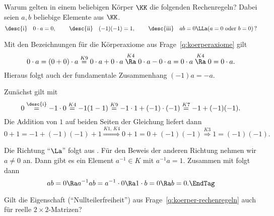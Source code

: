 \begin{frage} 
  \label{q:koerper-rechenregeln}
  Warum gelten in einem beliebigen Körper $\KK$ die folgenden 
  Rechenregeln? Dabei seien $a,b$ beliebige Elemente aus $\KK$. 
  \[
  \text{\desc{i}}\quad 0\cdot a=0, \hspace{0.8cm}
  \text{\desc{ii}}\quad  (-1)(-1)=1, \hspace{0.8cm}
  \text{\desc{iii}}\quad ab=0 \LLa (a=0 \text{ \rm{oder} } b=0)\,?
  \]
\end{frage}

\begin{antwort}
   Mit den Bezeichnungen für die Körperaxiome aus Frage~\ref{q:koerperaxiome} gilt
  \[
  0\cdot a = (0+0)\cdot a 
  \stackrel{K9}{=}0\cdot a+0\cdot a \stackrel{K4}{\Ra} 
  0\cdot a-0\cdot a = 0\cdot a 
  \stackrel{K4}{\Ra} 0=0\cdot a.
  \]
  Hieraus folgt auch der fundamentale Zusammenhang $(-1)a=-a$.

  \medskip
  \noindent
   Zunächst gilt mit 
  \[
  0 \stackrel{\text{\desc{i}}}{=}-1\cdot 0 \stackrel{K4}{=} -1(1-1)
  \stackrel{K9}{=} -1\cdot 1 +(-1)\cdot (-1) \stackrel{K7}{=} -1 +(-1)(-1).
  \]
  Die Addition von $1$ auf beiden Seiten der Gleichung liefert dann
  \[
  0+1 = -1+(-1)(-1)+1 \stackrel{K1,\,K4}{\Longrightarrow} 
  0+1 = 0+(-1)(-1)\stackrel{K3}{\Longrightarrow} 1=(-1)(-1).
  \]
 
  \medskip\noindent
   Die Richtung "`$\La$"' folgt aus . 
  Für den Beweis der anderen Richtung nehmen wir {\oBdA} 
  $a\not=0$ an. Dann gibt es 
  ein Element $a^{-1}\in K$ mit $a^{-1}a=1$. Zusammen mit  folgt 
  dann
  \begin{equation}
    ab=0 \Ra a^{-1}a b = a^{-1} \cdot 0  
    \Ra 1\cdot b=0 \Ra b=0. \EndTag
  \end{equation}
\end{antwort}

\begin{frage}
  Gilt die Eigenschaft  
  ("`Nullteilerfreiheit"') aus 
  Frage~\ref{q:koerper-rechenregeln} auch für reelle $2\times2$-Matrizen?
\end{frage}

